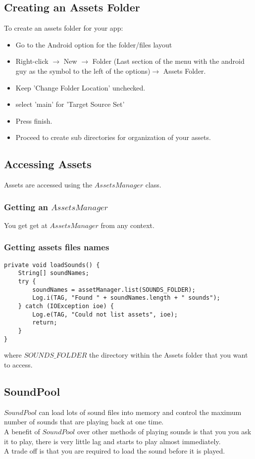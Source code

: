 \documentclass[]{article}
\begin{document}
\subsection{Creating an Assets Folder}
To create an assets folder for your app:
\begin{itemize}
	\item Go to the Android option for the folder/files layout 
	\item Right-click $\rightarrow$ New $\rightarrow$ Folder (Last section of the menu with the android guy as the symbol to the left of the options)$\rightarrow$ Assets Folder.
	\item Keep 'Change Folder Location' unchecked.
	\item select 'main' for 'Target Source Set'
	\item Press finish.
	\item Proceed to create sub directories for organization of your assets.
\end{itemize}

\subsection{Accessing Assets}
Assets are accessed using the $AssetsManager$ class.
\subsubsection{Getting an $AssetsManager$}
You get get at $AssetsManager$ from any context.

\subsubsection{Getting assets files names}
\begin{lstlisting}
private void loadSounds() {
	String[] soundNames;
	try {
		soundNames = assetManager.list(SOUNDS_FOLDER);
		Log.i(TAG, "Found " + soundNames.length + " sounds");
	} catch (IOException ioe) {
		Log.e(TAG, "Could not list assets", ioe);
		return;
	}
}
\end{lstlisting}
where $SOUNDS\_FOLDER$ the directory within the Assets folder that you want to access.

\subsection{SoundPool}
$SoundPool$ can load lots of sound files into memory and control the maximum number of sounds that are playing back at one time.
\\
A benefit of $SoundPool$ over other methods of playing sounds is that you you ask it to play, there is very little lag and starts to play almost immediately.
\\
A trade off is that you are required to load the sound before it is played.
\end{document}
